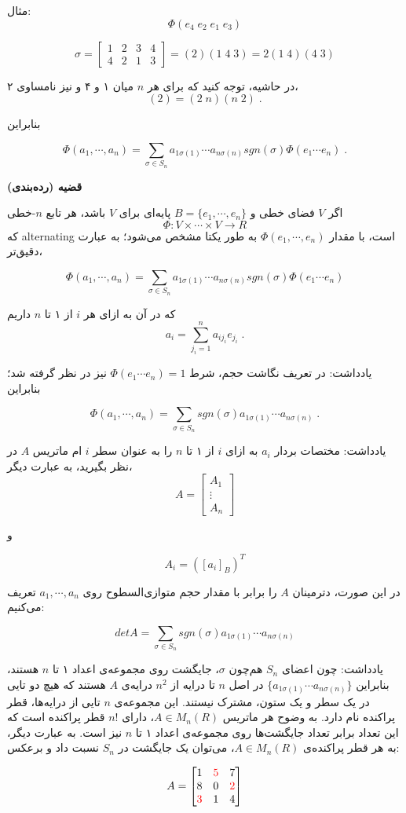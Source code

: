 	مثال:
	$$
	\Phi(e_4 \; e_2 \; e_1 \; e_3)
	$$
	
	$$
	\sigma = \begin{bmatrix}
	1 & 2 & 3 & 4 \\
	4 & 2 & 1 & 3
	\end{bmatrix} = (2) (1\; 4\; 3) = 2(1\; 4)(4\; 3)
	$$

در حاشیه، توجه کنید که برای هر $n$ میان ۱ و ۴ و نیز نامساوی ۲،
$$ (2) = (2\; n)(n\; 2) \; .$$

بنابراین

$$
\Phi(a_1,\cdots,a_n) = \sum_{\sigma \in S_n} a_{1\sigma(1)} \cdots a_{n\sigma(n)} sgn(\sigma) \Phi(e_1 \cdots e_n)\; .
$$

\textbf{قضیه (رده‌بندی)}

اگر $V$ فضای خطی و $B=\{e_1,\cdots,e_n\}$ پایه‌ای برای $V$ باشد، هر تابع $n$-خطی
$$\Phi: V \times \cdots \times V \to R $$
که alternating است، با مقدار $\Phi(e_1,\cdots,e_n)$ به طور یکتا مشخص می‌شود؛ به عبارت دقیق‌تر،

$$
\Phi(a_1,\cdots,a_n) = \sum_{\sigma \in S_n} a_{1\sigma(1)} \cdots a_{n\sigma(n)} sgn(\sigma) \Phi(e_1 \cdots e_n)
$$

که در آن به ازای هر $i$ از ۱ تا $n$ داریم
$$
a_i = \sum_{j_i=1}^n a_{ij_i}e_{j_i}\; .
$$

یادداشت: در تعریف نگاشت حجم، شرط 
$ \Phi(e_1 \cdots e_n) = 1$
نیز در نظر گرفته شد؛ بنابراین


$$
\Phi(a_1,\cdots,a_n) = \sum_{\sigma \in S_n} sgn(\sigma) a_{1\sigma(1)} \cdots a_{n\sigma(n)} \; .
$$

یادداشت: مختصات بردار $a_i$ به ازای $i$ از ۱ تا $n$ را به عنوان سطر $i$ ام ماتریس $A$ در نظر بگیرید، به عبارت دیگر،
$$A = \begin{bmatrix}
A_1 \\
\vdots \\
A_n
\end{bmatrix}
$$

و

$$ A_i = ([a_i]_B)^T$$

در این صورت، دترمینان $A$ را برابر با مقدار حجم متوازی‌السطوح روی $a_1,\cdots,a_n$ تعریف می‌کنیم:

$$ detA = \sum_{\sigma \in S_n} sgn(\sigma) a_{1\sigma(1)} \cdots a_{n\sigma(n)} $$

یادداشت: چون اعضای $S_n$ هم‌چون $\sigma$، جایگشت روی مجموعه‌ی اعداد ۱ تا $n$ هستند، بنابراین
$\{a_{1\sigma(1)} \cdots a_{n\sigma(n)}\}$
در اصل $n$ تا درایه از $n^2$ درایه‌ی $A$ هستند که هیچ دو تایی در یک سطر و یک ستون، مشترک نیستند.
این مجموعه‌ی $n$ تایی از درایه‌ها، قطر پراکنده نام دارد.
به وضوح هر ماتریس $A \in M_n(R)$، دارای $n!$ قطر پراکنده است که این تعداد برابر تعداد جایگشت‌ها روی مجموعه‌ی اعداد ۱ تا $n$ نیز است. به عبارت دیگر، به هر قطر پراکنده‌ی $A \in M_n(R)$، می‌توان یک جایگشت در $S_n$ نسبت داد و برعکس:

$$ A = \begin{bmatrix}
1 & {\color{red} 5} & 7 \\
8 & 0 & {\color{red} 2} \\
{\color{red} 3} & 1 & 4
\end{bmatrix} $$

